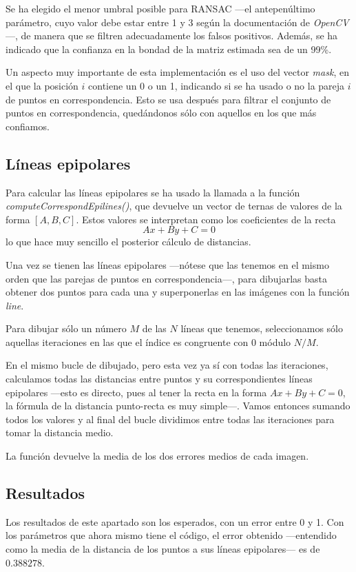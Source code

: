 \documentclass[a4paper, 11pt]{article}
\theoremstyle{definition}
\theoremstyle{theorem}
\begin{document}
    Se ha elegido el menor umbral posible para RANSAC ---el antepenúltimo parámetro, cuyo valor debe estar entre 1 y 3 según la documentación de \emph{OpenCV}---, de manera que se filtren adecuadamente los falsos positivos. Además, se ha indicado que la confianza en la bondad de la matriz estimada sea de un 99\%.

    Un aspecto muy importante de esta implementación es el uso del vector \emph{mask}, en el que la posición $i$ contiene un 0 o un 1, indicando si se ha usado o no la pareja $i$ de puntos en correspondencia. Esto se usa después para filtrar el conjunto de puntos en correspondencia, quedándonos sólo con aquellos en los que más confiamos.

    \subsection{Líneas epipolares}
    Para calcular las líneas epipolares se ha usado la llamada a la función \emph{computeCorrespondEpilines()}, que devuelve un vector de ternas de valores de la forma $[A,B,C]$. Estos valores se interpretan como los coeficientes de la recta
    \[
    Ax + By + C = 0
    \]
    lo que hace muy sencillo el posterior cálculo de distancias.

    Una vez se tienen las líneas epipolares ---nótese que las tenemos en el mismo orden que las parejas de puntos en correspondencia---, para dibujarlas basta obtener dos puntos para cada una y superponerlas en las imágenes con la función \emph{line}.

    Para dibujar sólo un número $M$ de las $N$ líneas que tenemos, seleccionamos sólo aquellas iteraciones en las que el índice es congruente con 0 módulo $N/M$.

    En el mismo bucle de dibujado, pero esta vez ya sí con todas las iteraciones, calculamos todas las distancias entre puntos y su correspondientes líneas epipolares ---esto es directo, pues al tener la recta en la forma $Ax+By+C = 0$, la fórmula de la distancia punto-recta es muy simple---. Vamos entonces sumando todos los valores y al final del bucle dividimos entre todas las iteraciones para tomar la distancia medio.

    La función devuelve la media de los dos errores medios de cada imagen.

    \subsection{Resultados}
    Los resultados de este apartado son los esperados, con un error entre 0 y 1. Con los parámetros que ahora mismo tiene el código, el error obtenido ---entendido como la media de la distancia de los puntos a sus líneas epipolares--- es de $0.388278$.
\end{document}
